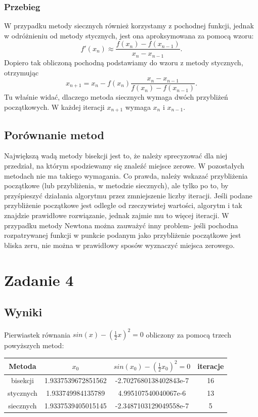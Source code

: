 \documentclass[12pt]{article}
\begin{document}
\subsubsection{Przebieg}
W przypadku metody siecznych również korzystamy z pochodnej funkcji, jednak w odróżnieniu od metody stycznych, jest ona aproksymowana za pomocą wzoru: $$f'(x_n)\approx\frac{f(x_n)-f(x_{n-1})}{x_n-x_{n-1}}.$$ Dopiero tak obliczoną pochodną podstawiamy do wzoru z metody stycznych, otrzymując $$x_{n+1}=x_n-f(x_n)\frac{x_n-x_{n-1}}{f(x_n)-f(x_{n-1})}.$$
Tu właśnie widać, dlaczego metoda siecznych wymaga dwóch przybliżeń początkowych. W każdej iteracji $x_{n+1}$ wymaga $x_n$ i $x_{n-1}$.

\subsection{Porównanie metod}
Największą wadą metody bisekcji jest to, że należy sprecyzować dla niej przedział, na którym spodziewamy się znaleźć miejsce zerowe. W pozostałych metodach nie ma takiego wymagania. Co prawda, należy wskazać przybliżenia początkowe (lub przybliżenia, w metodzie siecznych), ale tylko po to, by przyśpieszyć działania algorytmu przez zmniejszenie liczby iteracji. Jeśli podane przybliżenie początkowe jest odległe od rzeczywistej wartości, algorytm i tak znajdzie prawidłowe rozwiązanie, jednak zajmie mu to więcej iteracji. W przypadku metody Newtona można zauważyć inny problem- jeśli pochodna rozpatrywanej funkcji w punkcie podanym jako przybliżenie początkowe jest bliska zeru, nie można w prawidłowy sposów wyznaczyć miejsca zerowego.

\section{Zadanie 4}
\subsection{Wyniki}
Pierwiastek równania $sin(x) - (\frac{1}{2}x)^2 = 0$ obliczony za pomocą trzech powyższych metod:

\begin{center}
\begin{tabular}{ |c|c|c|c| }
\hline
Metoda & $x_0$ & $sin(x_0) - (\frac{1}{2}x_0)^2 = 0$ & iteracje\\ \hline
bisekcji & 1.9337539672851562 & -2.7027680138402843e-7 & 16 \\
stycznych & 1.933749984135789 & 4.995107540040067e-6 & 13\\
siecznych & 1.9337539405015145 & -2.3487103129049558e-7 & 5\\ \hline
\end{tabular}
\end{center}
\end{document}
